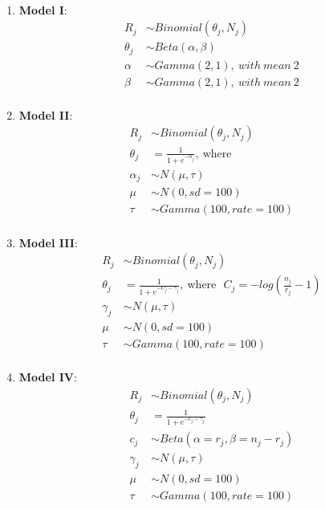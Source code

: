 \documentclass[10pt,letterpaper]{article}
\begin{document}
~\\
\begin{enumerate}
	\item\textbf{Model I}:
		\begin{align*}
			R_j &\sim Binomial(\theta_j, N_j)\\
			\theta_j &\sim Beta(\alpha, \beta)\\
			\alpha &\sim Gamma(2, 1),~with~mean~2\\
			\beta &\sim Gamma(2, 1),~with~mean~2\\
		\end{align*}
		

	\item\textbf{Model II}:
		\begin{align*}
			R_j &\sim Binomial\left(\theta_j, N_j \right)\\
			\theta_j &=\frac{1}{1+e^{- \alpha_j}},~\text{where}\\
			\alpha_j &\sim N(\mu, \tau)\\
			\mu &\sim N(0, sd=100)\\
			\tau &\sim Gamma(100, rate=100)\\
		\end{align*}
		

  \item\textbf{Model III}: 
		\begin{align*}
			R_j &\sim Binomial\left(\theta_j, N_j \right)\\
			\theta_j &=\frac{1}{1+e^{-C_j - \gamma_j}},~\text{where}~~~C_j = -log\left(\frac{n_j}{r_j}-1\right)\\
			\gamma_j &\sim N(\mu, \tau)\\
			\mu &\sim N(0, sd=100)\\
			\tau &\sim Gamma(100, rate=100)\\
		\end{align*}
		
  \item\textbf{Model IV}: 
		\begin{align*}
			R_j &\sim Binomial\left(\theta_j, N_j \right)\\
			\theta_j &=\frac{1}{1+e^{-c_j - \gamma_j}}\\
      c_j &\sim Beta(\alpha = r_j, \beta = n_j - r_j)\\
			\gamma_j &\sim N(\mu, \tau)\\
			\mu &\sim N(0, sd=100)\\
			\tau &\sim Gamma(100, rate=100)\\
		\end{align*}
		

\end{enumerate}
\end{document}
